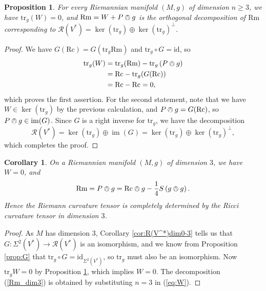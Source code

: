 \documentclass{amsart}
\numberwithin{equation}{section}
\def\~#1{\mathscr{#1}}
\newcommand{\im}{\mathop{\mathrm{im}}}
\newcommand{\tr}{\mathrm{tr}}
\newcommand{\id}{\mathrm{id}}
\newcommand{\Rc}{\mathrm{Rc}}
\newcommand{\Rm}{\mathrm{Rm}}
\theoremstyle{plain}
\newtheorem{prop}[thm]{Proposition}
\newtheorem{cor}[thm]{Corollary}
\theoremstyle{definition}
\theoremstyle{remark}
\begin{document}
\begin{prop}\label{prop:tr_g(W)=0}
    For every Riemannian manifold $(M, g)$ of dimension $n \ge 3$, we have $\tr_g(W) = 0$, and $\Rm = W + P \owedge g$ is the orthogonal decomposition of $\Rm$ corresponding to $\~R(V^*) = \ker(\tr_g) \oplus \ker(\tr_g)^\perp$.
\end{prop}
\begin{proof}
    We have $G(\Rc) = G(\tr_g{\Rm})$ and $\tr_g \circ G = \id$, so
    \begin{align*}
        \tr_g(W) &= \tr_g(\Rm) - \tr_g\left(P \owedge g\right)\\ 
                 &= \Rc - \tr_g(G(\Rc))\\
                 &= \Rc - \Rc = 0,
    \end{align*}
    which proves the first assertion. For the second statement, note that we have $W \in \ker(\tr_g)$ by the previous calculation, and $P \owedge g = G(\Rc)$, so $P \owedge g \in \im(G)$. Since $G$ is a right inverse for $\tr_g$, we have the decomposition 
    \[\~R(V^*)  = \ker(\tr_g) \oplus \im(G) = \ker(\tr_g) \oplus \ker(\tr_g)^\perp,\]
    which completes the proof.
\end{proof}

\begin{cor}\label{cor:W=0}
    On a Riemannian manifold $(M, g)$ of dimension $3$, we have $W = 0$, and
    \begin{equation}\label{Rm_dim3}\Rm = P \owedge g = \Rc \owedge g - \frac{1}{4} S \left(g \owedge g\right).\end{equation}
    Hence the Riemann curvature tensor is completely determined by the Ricci curvature tensor in dimension $3$.
\end{cor}
\begin{proof}
    As $M$ has dimension $3$, Corollary \ref{cor:R(V^*)dim0-3} tells us that $G: \Sigma^2(V^*) \to \~R(V^*)$ is an isomorphism, and we know from Proposition \ref{prop:G} that $\tr_g \circ G = \id_{\Sigma^2(V^*)}$, so $\tr_g$ must also be an isomorphism. Now $\tr_g W = 0$ by Proposition \ref{prop:tr_g(W)=0}, which implies $W = 0$. The decomposition (\ref{Rm_dim3}) is obtained by substituting $n=3$ in (\ref{eq:W}).
\end{proof}
\end{document}

